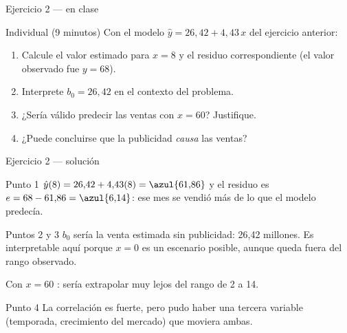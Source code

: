 \documentclass[aspectratio=169,10pt]{beamer}
\begin{document}
\begin{frame}{Ejercicio 2 — en clase}
  \begin{alertblock}{Individual (9 minutos)}
    Con el modelo $\hat{y}=26{,}42+4{,}43\,x$ del ejercicio anterior:

    \vspace{0.25cm}
    \begin{enumerate}
      \item Calcule el valor estimado para $x=8$ y el residuo correspondiente
            (el valor observado fue $y=68$).
      \item Interprete $b_0=26{,}42$ en el contexto del problema.
      \item ¿Sería válido predecir las ventas con $x=60$? Justifique.
      \item ¿Puede concluirse que la publicidad \emph{causa} las ventas?
    \end{enumerate}
  \end{alertblock}
\end{frame}

\begin{frame}{Ejercicio 2 — solución}
  \small
  \begin{block}{Punto 1}
    \footnotesize
    $\hat{y}(8)=26{,}42+4{,}43(8)=\azul{61{,}86}$ \quad y el residuo es
    $e=68-61{,}86=\azul{6{,}14}$: ese mes se vendió más de lo que el modelo
    predecía.
  \end{block}

  \vspace{0.1cm}
  \begin{exampleblock}{Puntos 2 y 3}
    \footnotesize
    $b_0$ sería la venta estimada sin publicidad: 26{,}42 millones. Es
    interpretable aquí porque $x=0$ es un escenario posible, aunque queda
    fuera del rango observado.

    \vspace{0.1cm}
    Con $x=60$ : sería extrapolar muy lejos del rango de 2 a 14.
  \end{exampleblock}

  \vspace{0.1cm}
  \begin{alertblock}{Punto 4}
    \footnotesize
     La correlación es fuerte, pero pudo haber una tercera
    variable (temporada, crecimiento del mercado) que moviera ambas.
  \end{alertblock}
\end{frame}

\end{document}
